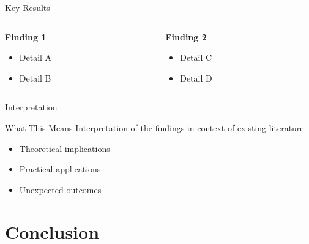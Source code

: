 \documentclass[
  12pt,
  aspectratio=169,  %
  t,                %
  ignorenonframetext %
]{beamer}
\begin{document}
\begin{frame}{Key Results}
  
  \begin{columns}[t]
    \begin{column}{0.5\textwidth}
      \textbf{Finding 1}
      \begin{itemize}
        \item Detail A
        \item Detail B
      \end{itemize}
    \end{column}
    
    \begin{column}{0.5\textwidth}
      \textbf{Finding 2}
      \begin{itemize}
        \item Detail C
        \item Detail D
      \end{itemize}
    \end{column}
  \end{columns}
  
\end{frame}

\begin{frame}{Interpretation}
  
  \begin{block}{What This Means}
    Interpretation of the findings in context of existing literature
  \end{block}
  
  \begin{itemize}
    \item Theoretical implications
    \item Practical applications
    \item Unexpected outcomes
  \end{itemize}
  
\end{frame}

\section{Conclusion}
\end{document}
